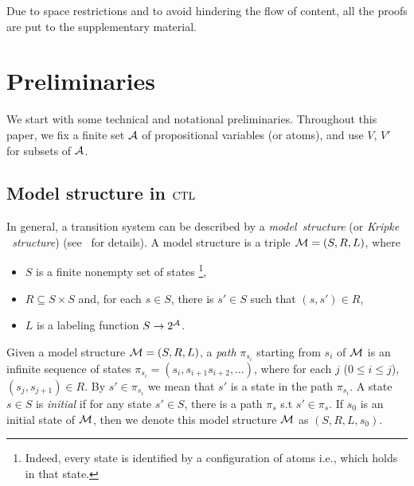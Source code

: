 \documentclass{article}
\begin{document}
Due to space restrictions and to avoid hindering the flow of content, all the proofs are put to the supplementary material.   




 \section{Preliminaries}
 We start with some technical and notational preliminaries. Throughout this paper, we fix a finite set ${\cal A}$ of propositional variables (or atoms), and use $V$, $V'$ for subsets of ${\cal A}$.
\subsection{Model structure in $\textrm{CTL}$}
In general, a transition system
 can be described by a \emph{model\ structure} (or \emph{Kripke \ structure}) (see~\cite{Baier:PMC:2008} for details). A model structure is a triple ${\cal M}=(S,R,L)$, where
\begin{itemize}
  \item $S$ is a finite nonempty set of states \footnote{Indeed, every state is identified by a configuration of atoms i.e., which holds in that state.},
  \item $R\subseteq S\times S$ and, for each $s\in S$, there
  is $s'\in S$ such that $(s,s')\in R$,
  \item $L$ is a labeling function $S\rightarrow 2^{\cal A}$.
\end{itemize}

Given a model structure ${\cal M}=(S,R,L)$, a \emph{path} $\pi_{s_i}$ starting from $s_i$ of ${\cal M}$ is an infinite sequence of states $\pi_{s_i}=(s_i, s_{i+1} s_{i+2},\dots)$, where for each $j$ ($0\leq i\leq j$), $(s_j, s_{j+1}) \in R$. By $s'\in \pi_{s_i}$ we mean that $s'$ is a state in the path $\pi_{s_i}$.
A state $s\in S$ is {\em initial} if for any state $s'\in S$, there is a path $\pi_s$ s.t $s'\in \pi_s$.
If $s_0$ is an initial state of ${\cal M}$, then we denote this model structure ${\cal M}$ as $(S,R,L,s_0)$.
\end{document}

